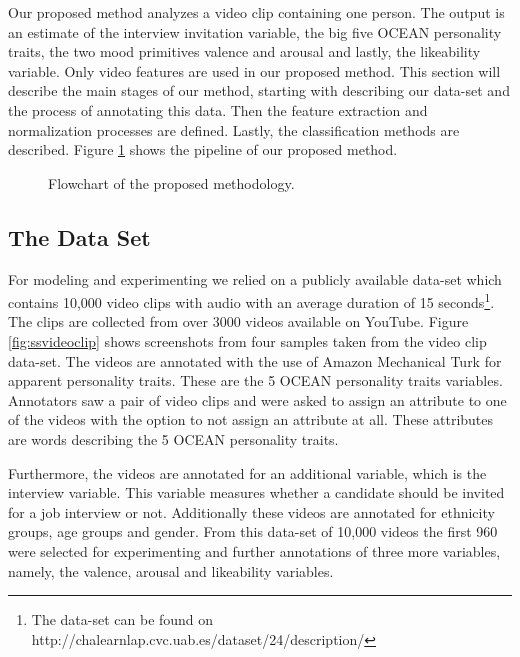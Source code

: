 
Our proposed method analyzes a video clip containing one person. The output is an estimate of the interview invitation variable, the big five OCEAN personality traits, the two mood primitives valence and arousal and lastly, the likeability variable. Only video features are used in our proposed method. This section will describe the main stages of our method, starting with describing our data-set and the process of annotating this data. Then the feature extraction and normalization processes are defined. Lastly, the classification methods are described. Figure \ref{fig:proposedmethod} shows the pipeline of our proposed method.

\begin{figure}[h]
  \centering
  
  \caption{Flowchart of the proposed methodology.}
  \label{fig:proposedmethod}
\end{figure}

\subsection{The Data Set}
\label{subsection:dataset}
For modeling and experimenting we relied on a publicly available data-set which contains 10,000 video clips with audio with an average duration of 15 seconds\footnote{The data-set can be found on http://chalearnlap.cvc.uab.es/dataset/24/description/}. The clips are collected from over 3000 videos available on YouTube. Figure \ref{fig:ssvideoclip} shows screenshots from four samples taken from the video clip data-set. The videos are annotated with the use of Amazon Mechanical Turk for apparent personality traits. These are the 5 OCEAN personality traits variables. Annotators saw a pair of video clips and were asked to assign an attribute to one of the videos with the option to not assign an attribute at all. These attributes are words describing the 5 OCEAN personality traits. 

Furthermore, the videos are annotated for an additional variable, which is the interview variable. This variable measures whether a candidate should be invited for a job interview or not. Additionally these videos are annotated for ethnicity groups, age groups and gender. From this data-set of 10,000 videos the first 960 were selected for experimenting and further annotations of three more variables, namely, the valence, arousal and likeability variables. 


